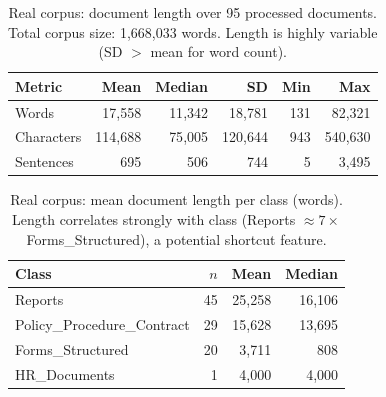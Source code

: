 \begin{table}[t]
  \centering
  \caption{Real corpus: document length over 95 processed documents.
  Total corpus size: 1{,}668{,}033 words. Length is highly variable
  (SD $>$ mean for word count).}
  \label{tab:doc-length}
  \begin{tabular}{lrrrrr}
    \toprule
    Metric & Mean & Median & SD & Min & Max \\
    \midrule
    Words      &  17{,}558 &  11{,}342 &  18{,}781 & 131 &  82{,}321 \\
    Characters & 114{,}688 &  75{,}005 & 120{,}644 & 943 & 540{,}630 \\
    Sentences  &       695 &       506 &       744 &   5 &   3{,}495 \\
    \bottomrule
  \end{tabular}
\end{table}

\begin{table}[t]
  \centering
  \caption{Real corpus: mean document length per class (words).
  Length correlates strongly with class (Reports $\approx 7\times$
  Forms\_Structured), a potential shortcut feature.}
  \label{tab:length-per-class}
  \begin{tabular}{lrrr}
    \toprule
    Class & $n$ & Mean & Median \\
    \midrule
    Reports                    & 45 & 25{,}258 & 16{,}106 \\
    Policy\_Procedure\_Contract & 29 & 15{,}628 & 13{,}695 \\
    Forms\_Structured          & 20 &  3{,}711 &     808 \\
    HR\_Documents              &  1 &  4{,}000 &   4{,}000 \\
    \bottomrule
  \end{tabular}
\end{table}

